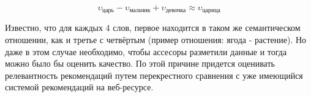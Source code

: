 \begin{equation}
	\upsilon_\text{царь} - \upsilon_\text{мальчик} + \upsilon_\text{девочка} \approx \upsilon_\text{царица}
\end{equation}

Известно, что для каждых 4 слов, первое находится в таком же семантическом отношении, как и третье с четвёртым (пример отношения: ягода - растение).
Но даже в этом случае необходимо, чтобы ассесоры разметили данные и тогда можно было бы оценить качество. По этой причине придется оценивать релевантность рекомендаций путем перекрестного сравнения с уже имеющийся системой рекомендаций на веб-ресурсе.


%
